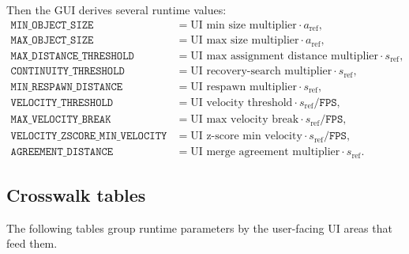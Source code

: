 \documentclass[11pt]{article}
\newcommand{\runtimekey}[1]{\texttt{#1}}
\begin{document}
Then the GUI derives several runtime values:
\begin{align}
  \runtimekey{MIN\_OBJECT\_SIZE} &= \text{UI min size multiplier} \cdot a_{\text{ref}}, \\
  \runtimekey{MAX\_OBJECT\_SIZE} &= \text{UI max size multiplier} \cdot a_{\text{ref}}, \\
  \runtimekey{MAX\_DISTANCE\_THRESHOLD} &= \text{UI max assignment distance multiplier} \cdot s_{\text{ref}}, \\
  \runtimekey{CONTINUITY\_THRESHOLD} &= \text{UI recovery-search multiplier} \cdot s_{\text{ref}}, \\
  \runtimekey{MIN\_RESPAWN\_DISTANCE} &= \text{UI respawn multiplier} \cdot s_{\text{ref}}, \\
  \runtimekey{VELOCITY\_THRESHOLD} &= \text{UI velocity threshold} \cdot s_{\text{ref}} / \runtimekey{FPS}, \\
  \runtimekey{MAX\_VELOCITY\_BREAK} &= \text{UI max velocity break} \cdot s_{\text{ref}} / \runtimekey{FPS}, \\
  \runtimekey{VELOCITY\_ZSCORE\_MIN\_VELOCITY} &= \text{UI z-score min velocity} \cdot s_{\text{ref}} / \runtimekey{FPS}, \\
  \runtimekey{AGREEMENT\_DISTANCE} &= \text{UI merge agreement multiplier} \cdot s_{\text{ref}}.
\end{align}

\subsection{Crosswalk tables}

The following tables group runtime parameters by the user-facing UI areas that feed them.
\end{document}
